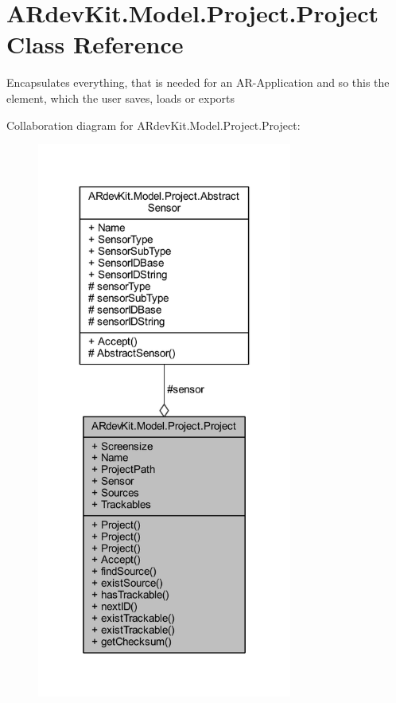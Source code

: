 \hypertarget{class_a_rdev_kit_1_1_model_1_1_project_1_1_project}{\section{A\-Rdev\-Kit.\-Model.\-Project.\-Project Class Reference}
\label{class_a_rdev_kit_1_1_model_1_1_project_1_1_project}
}


Encapsulates everything, that is needed for an A\-R-\/\-Application and so this the element, which the user saves, loads or exports  




Collaboration diagram for A\-Rdev\-Kit.\-Model.\-Project.\-Project\-:
\nopagebreak
\begin{figure}[H]
\begin{center}
\leavevmode
\includegraphics[width=238pt]{class_a_rdev_kit_1_1_model_1_1_project_1_1_project__coll__graph}
\end{center}
\end{figure}
